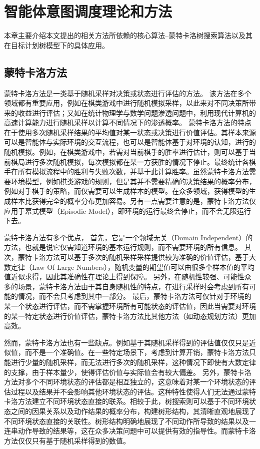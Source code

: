 \chapter{智能体意图调度理论和方法}
本章主要介绍本文提出的相关方法所依赖的核心算法--蒙特卡洛树搜索算法以及其在目标计划树模型下的具体应用。
\section{蒙特卡洛方法}
蒙特卡洛方法是一类基于随机采样对决策或状态进行评估的方法。
该方法在多个领域都有重要应用，例如在棋类游戏中进行随机模拟采样，以此来对不同决策所带来的收益进行评估；又如在统计物理学与数学问题渗透问题中，利用现代计算机的高速计算能力进行随机采样以计算不同情况下的渗透概率。
蒙特卡洛方法的特点在于使用多次随机采样结果的平均值对某一状态或决策进行价值评估。其样本来源可以是智能体与实际环境的交互流程，也可以是智能体基于对环境的认知，进行的随机模拟。例如，在棋类游戏中，若需对当前棋手的胜率进行估计，则可以基于当前棋局进行多次随机模拟，每次模拟都在某一方获胜的情况下停止。最终统计各棋手在所有模拟流程中的胜利与失败次数，并基于此计算胜率。虽然蒙特卡洛方法需要环境模型，例如棋类游戏的规则，但是其并不需要精确的决策结果的概率分布，例如对手棋手的策略，而仅需要可以生成样本的模型。在众多领域，获得模型的生成样本比获得完全的概率分布更加容易。另有一点需要注意的是，蒙特卡洛方法仅应用于幕式模型（Episodic Model），即环境的运行最终会停止，而不会无限运行下去。

蒙特卡洛方法有多个优点，
首先，它是一个领域无关（Domain Independent）的方法，也就是说它仅需知道环境的基本运行规则，而不需要环境的所有信息。
%
其次，蒙特卡洛方法可以基于多次的随机采样采样提供较为准确的价值评估，基于大数定律（Law Of Large Numbers），随机变量的期望值可以由很多个样本值的平均值近似求得，因此其准确性在理论上得到保障。
%
另外，在随机性较强、可能性众多的场景，蒙特卡洛方法由于其自身随机性的特点，在进行采样时会考虑到所有可能的情况，而不会只考虑到其中一部分。
%
最后，蒙特卡洛方法可仅针对于环境的某一个状态进行评估，而不需掌握环境所有可能状态的评估值，因此当需要对环境的某一特定状态进行价值评估，蒙特卡洛方法比其他方法（如动态规划方法）更加高效。

然而，蒙特卡洛方法也有一些缺点。例如基于其随机采样得到的评估值仅仅只是近似值，而不是一个准确值。在一些特定场景下，考虑到计算开销，蒙特卡洛方法只能进行少量的随机采样，而无法进行多次的随机采样，这种情况下即使有大数定律的支撑，由于样本量少，使得评估价值与实际值会有较大偏差。
%
另外，蒙特卡洛方法对多个不同环境状态的评估都是相互独立的，这意味着对某一个环境状态的评估过程以及结果并不会影响其他环境状态的评估。这种特性使得人们无法通过蒙特卡洛方法建立不同环境状态直接的联系。相较于此，树搜索则可以基于不同环境状态之间的因果关系以及动作结果的概率分布，构建树形结构，其清晰直观地展现了不同环境状态直接的关联性。树形结构明确地展现了不同动作所导致的结果以及一连串动作导致的结果等，这在众多决策问题中可以提供有效的指导性。而蒙特卡洛方法仅仅只有基于随机采样得到的数值。
